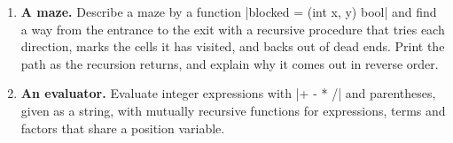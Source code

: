 \begin{enumerate}
  relative to \code|+| (resistances in series), and add an assigning
  form \code|PARAB| in the style of \code|+:=|. Compute a network of
  several resistors with one formula.
\item \textbf{A maze.} Describe a maze by a function
  \code|blocked = (int x, y) bool| and find a way from the entrance to
  the exit with a recursive procedure that tries each direction, marks
  the cells it has visited, and backs out of dead ends. Print the path as the
  recursion returns, and explain why it comes out in reverse order.
\item \textbf{An evaluator.} Evaluate integer expressions with
  \code|+ - * /| and parentheses, given as a string, with mutually
  recursive functions for expressions, terms and factors that share a
  position variable.
\end{enumerate}
